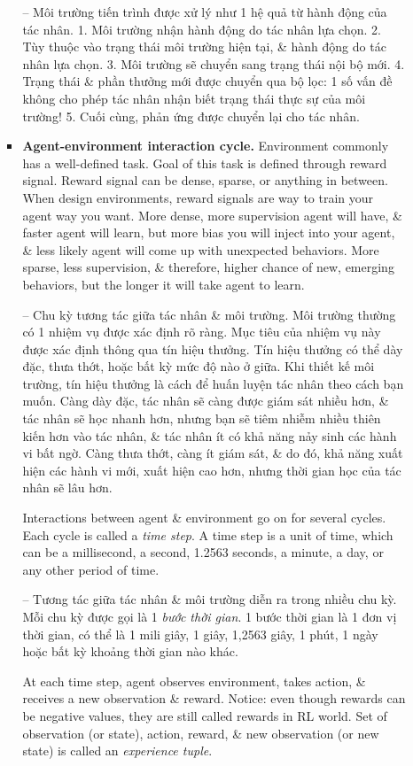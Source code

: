\documentclass{article}
\begin{document}
\begin{itemize}
\begin{itemize}
\begin{itemize}
            -- {\sf Môi trường tiến trình được xử lý như 1 hệ quả từ hành động của tác nhân.} 1. Môi trường nhận hành động do tác nhân lựa chọn. 2. Tùy thuộc vào trạng thái môi trường hiện tại, \& hành động do tác nhân lựa chọn. 3. Môi trường sẽ chuyển sang trạng thái nội bộ mới. 4. Trạng thái \& phần thưởng mới được chuyển qua bộ lọc: 1 số vấn đề không cho phép tác nhân nhận biết trạng thái thực sự của môi trường! 5. Cuối cùng, phản ứng được chuyển lại cho tác nhân.
            \item {\bf Agent-environment interaction cycle.} Environment commonly has a well-defined task. Goal of this task is defined through reward signal. Reward signal can be dense, sparse, or anything in between. When design environments, reward signals are way to train your agent way you want. More dense, more supervision agent will have, \& faster agent will learn, but more bias you will inject into your agent, \& less likely agent will come up with unexpected behaviors. More sparse, less supervision, \& therefore, higher chance of new, emerging behaviors, but the longer it will take agent to learn.

            -- {\sf Chu kỳ tương tác giữa tác nhân \& môi trường.} Môi trường thường có 1 nhiệm vụ được xác định rõ ràng. Mục tiêu của nhiệm vụ này được xác định thông qua tín hiệu thưởng. Tín hiệu thưởng có thể dày đặc, thưa thớt, hoặc bất kỳ mức độ nào ở giữa. Khi thiết kế môi trường, tín hiệu thưởng là cách để huấn luyện tác nhân theo cách bạn muốn. Càng dày đặc, tác nhân sẽ càng được giám sát nhiều hơn, \& tác nhân sẽ học nhanh hơn, nhưng bạn sẽ tiêm nhiễm nhiều thiên kiến hơn vào tác nhân, \& tác nhân ít có khả năng nảy sinh các hành vi bất ngờ. Càng thưa thớt, càng ít giám sát, \& do đó, khả năng xuất hiện các hành vi mới, xuất hiện cao hơn, nhưng thời gian học của tác nhân sẽ lâu hơn.

            Interactions between agent \& environment go on for several cycles. Each cycle is called a {\it time step}. A time step is a unit of time, which can be a millisecond, a second, 1.2563 seconds, a minute, a day, or any other period of time.

            -- Tương tác giữa tác nhân \& môi trường diễn ra trong nhiều chu kỳ. Mỗi chu kỳ được gọi là 1 {\it bước thời gian}. 1 bước thời gian là 1 đơn vị thời gian, có thể là 1 mili giây, 1 giây, 1,2563 giây, 1 phút, 1 ngày hoặc bất kỳ khoảng thời gian nào khác.

            At each time step, agent observes environment, takes action, \& receives a new observation \& reward. Notice: even though rewards can be negative values, they are still called rewards in RL world. Set of observation (or state), action, reward, \& new observation (or new state) is called an {\it experience tuple}.


\end{itemize}
\end{itemize}
\end{itemize}
\end{document}
